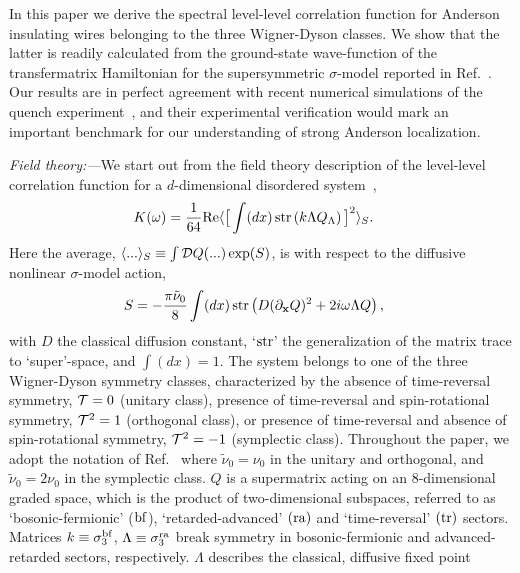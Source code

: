 \documentclass[twocolumn,showpacs,aps,prl]{revtex4}
\begin{document}
In this paper we derive the spectral level-level correlation function for Anderson insulating wires belonging 
to the three Wigner-Dyson classes. 
We show that the latter is readily calculated from the ground-state wave-function of the transfermatrix 
Hamiltonian for the supersymmetric $\sigma$-model 
reported in Ref.~\cite{Khalaf}. 
Our results are in perfect agreement 
with recent 
numerical simulations of the quench experiment~\cite{fwd5}, and 
their experimental verification 
would mark an important 
benchmark 
for our understanding of strong Anderson localization. 




{\it Field theory:---}We start out from the field theory description 
of the level-level correlation function for a $d$-dimensional disordered 
system~\cite{EfetovBook,EfetovAdv,efetovreview}, 
\begin{align}
\label{KsM}
K(\omega) 
&=
{1\over 64} {\rm Re}
\langle 
\big[ \int (dx)\, 
{\rm str}\left(
k\Lambda
Q_\Lambda
\right)
 \big]^2
 \rangle_S.
\end{align} 
Here the average, 
$\langle ... \rangle_S\equiv \int {\cal D}Q(...)\exp(S)$,
is with respect to the 
diffusive nonlinear 
$\sigma$-model action, 
\begin{align}
\label{action}
S
&=  -{\pi\tilde{\nu}_0 \over 8} \int (dx)\, 
{\rm str}\left(
D(\partial_\bold{x} Q)^2 
+
2i\omega \Lambda Q
\right),
\end{align}
with $D$ the classical diffusion constant, 
`${\rm str}$' the generalization of the matrix trace to `super'-space, and $\int (dx)=1$.
The system belongs to one of the three Wigner-Dyson symmetry classes, 
characterized by the absence of  time-reversal symmetry, ${\cal T}=0$ (unitary class),
presence of time-reversal and spin-rotational symmetry, ${\cal T}^2=1$ (orthogonal class),
or 
presence of time-reversal and absence of spin-rotational symmetry, ${\cal T}^2=-1$ (symplectic class). 
Throughout the paper, we adopt the notation of Ref.~ where
$\tilde{\nu}_0=\nu_0$ in the unitary 
and orthogonal, and  
$\tilde{\nu}_0=2\nu_0$ 
in the symplectic class. 
$Q$ is a supermatrix 
acting on an $8$-dimensional 
graded space, which is the product of two-dimensional 
subspaces, referred to as `bosonic-fermionic'  (${\rm bf}$), 
`retarded-advanced' $({\rm ra})$ and 
 `time-reversal' $({\rm tr})$ sectors. 
 Matrices $k\equiv\sigma_3^{\rm bf}$, 
 $\Lambda\equiv\sigma_3^{\rm ra}$
break symmetry in bosonic-fermionic and advanced-retarded sectors, 
respectively. 
$\Lambda$ describes the classical, diffusive fixed point
\end{document}
